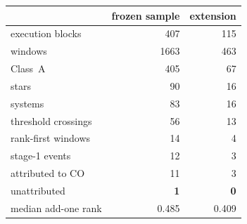\begin{tabular}{@{}lrr@{}}
\toprule
 & frozen sample & extension \\
\midrule
execution blocks & 407 & 115 \\
windows & 1663 & 463 \\
\quad Class~A & 405 & 67 \\
stars & 90 & 16 \\
systems & 83 & 16 \\
\midrule
threshold crossings & 56 & 13 \\
rank-first windows & 14 & 4 \\
stage-1 events & 12 & 3 \\
\quad attributed to CO & 11 & 3 \\
\quad unattributed & \textbf{1} & \textbf{0} \\
\midrule
median add-one rank & 0.485 & 0.409 \\
\bottomrule
\end{tabular}
